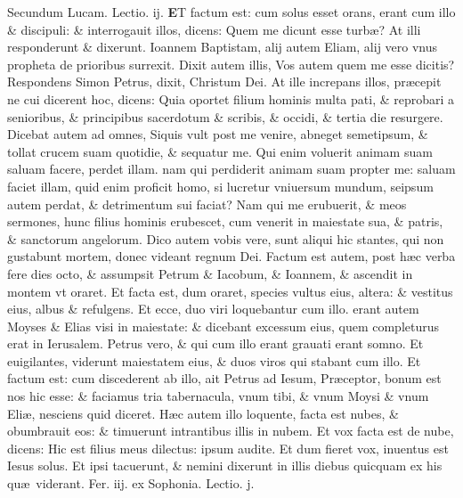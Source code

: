 \documentclass[a5paper,10pt]{book}
\def\leftmarginnote{%
	\lrmarginnote{\hskip -\marginparsep \hskip -6.5em}}
\def\ae{æ}
\begin{document}
\begin{multicols*}{2}
\newline \color{red} Secundum Lucam. \hfill Lectio. ij. \color{black}
\vspace{-.25em}
\lettrine[lines=2]{\bfseries \color{red} E}{}T\leftmarginnote{\begin{flushright}ca. 9.\end{flushright}} factum est: cum solus esset orans, erant cum illo \& discipuli: \& interrogauit illos, dicens: Quem me dicunt esse turb\ae ?
At illi responderunt \& dixerunt.
Ioannem Baptistam, alij autem Eliam, alij vero vnus propheta de prioribus surrexit.
Dixit autem illis, Vos autem quem me esse dicitis? Respondens Simon Petrus, dixit, Christum Dei.
At ille increpans illos, pr\ae cepit ne cui dicerent hoc, dicens: Quia oportet filium hominis multa pati, \& reprobari a senioribus, \& principibus sacerdotum \& scribis, \& occidi, \& tertia die resurgere.
Dicebat autem ad omnes, Siquis vult post me venire, abneget semetipsum, \& tollat crucem suam quotidie, \& sequatur me.
Qui enim voluerit animam suam saluam facere, perdet illam. nam qui perdiderit animam suam propter me: saluam faciet illam, quid enim proficit homo, si lucretur vniuersum mundum, seipsum autem perdat, \& detrimentum sui faciat?
Nam qui me erubuerit, \& meos sermones, hunc filius hominis erubescet, cum venerit in maiestate sua, \& patris, \& sanctorum angelorum.
Dico autem vobis vere, sunt aliqui hic stantes, qui non gustabunt mortem, donec videant regnum Dei.
Factum est autem, post h\ae c verba
fere dies octo, \& assumpsit Petrum \& Iacobum, \& Ioannem, \& ascendit in montem vt oraret.
Et facta est, dum oraret, species vultus eius, altera: \& vestitus eius, albus \& refulgens. Et ecce, duo viri loquebantur cum illo. erant autem Moyses \& Elias visi in maiestate: \& dicebant excessum eius, quem completurus erat in Ierusalem.
Petrus vero, \& qui cum illo erant grauati erant somno.
Et euigilantes, viderunt maiestatem eius, \& duos viros qui stabant cum illo.
Et factum est: cum discederent ab illo, ait Petrus ad Iesum, Pr\ae ceptor, bonum est nos hic esse: \& faciamus tria tabernacula, vnum tibi, \& vnum Moysi \& vnum Eli\ae , nesciens quid diceret.
H\ae c autem illo loquente, facta est nubes, \& obumbrauit eos: \& timuerunt intrantibus illis in nubem.
Et vox facta est de nube, dicens: Hic est filius meus dilectus: ipsum audite.
Et dum fieret vox, inuentus est Iesus solus. Et ipsi tacuerunt, \& nemini dixerunt in illis diebus quicquam ex his qu\ae \ viderant.
\newline {} \color{red} \hypertarget{TUE-QVARTA-ADV}{Fer. iij.} ex Sophonia. \hfill Lectio. j. \color{black}

\end{multicols*}
\end{document}
